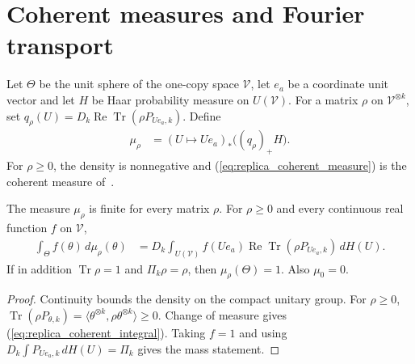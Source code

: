 \section{Coherent measures and Fourier transport}

\begin{definition}
    \label{def:replica_coherent_sphere_measure}
    \leanok
    Let $\Theta$ be the unit sphere of the one-copy space $\mathcal V$, let
    $e_a$ be a coordinate unit vector and let $H$ be Haar probability measure
    on $U(\mathcal V)$. For a matrix $\rho$ on $\mathcal V^{\otimes k}$, set
    $q_\rho(U)=D_k\operatorname{Re}\operatorname{Tr}(\rho P_{Ue_a,k})$. Define
    \begin{align}
        \mu_\rho & =(U\mapsto Ue_a)_*\bigl((q_\rho)_+H\bigr).
        \label{eq:replica_coherent_measure}
    \end{align}
    For $\rho\ge0$, the density is nonnegative and
    (\ref{eq:replica_coherent_measure}) is the coherent measure
    of~\cite[Proposition~7.4]{OpenAI2026AreaLaw}.
\end{definition}

\begin{theorem}
    \label{thm:replica_coherent_measure_integral}
    \leanok
    The measure $\mu_\rho$ is finite for every matrix $\rho$. For $\rho\ge0$
    and every continuous real function $f$ on $\mathcal V$,
    \begin{align}
        \int_\Theta f(\theta)\,d\mu_\rho(\theta)
         & =D_k\int_{U(\mathcal V)}f(Ue_a)
        \operatorname{Re}\operatorname{Tr}(\rho P_{Ue_a,k})\,dH(U).
        \label{eq:replica_coherent_integral}
    \end{align}
    If in addition $\operatorname{Tr}\rho=1$ and $\Pi_k\rho=\rho$, then
    $\mu_\rho(\Theta)=1$. Also $\mu_0=0$.
\end{theorem}
\begin{proof}\leanok
    Continuity bounds the density on the compact unitary group. For $\rho\ge0$,
    $\operatorname{Tr}(\rho P_{\theta,k})
        =\langle\theta^{\otimes k},\rho\theta^{\otimes k}\rangle\ge0$.
    Change of measure gives (\ref{eq:replica_coherent_integral}). Taking $f=1$
    and using $D_k\int P_{Ue_a,k}\,dH(U)=\Pi_k$ gives the mass statement.
\end{proof}


